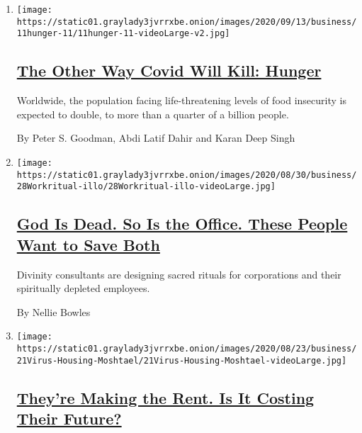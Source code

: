 \begin{enumerate}
\def\labelenumi{\arabic{enumi}.}
\item
  \texttt{[image: https://static01.graylady3jvrrxbe.onion/images/2020/09/13/business/11hunger-11/11hunger-11-videoLarge-v2.jpg]}

  \hypertarget{the-other-way-covid-will-kill-hunger-1}{%
  \subsection{\texorpdfstring{\href{/2020/09/11/business/covid-hunger-food-insecurity.html}{The
  Other Way Covid Will Kill:
  Hunger}}{The Other Way Covid Will Kill: Hunger}}\label{the-other-way-covid-will-kill-hunger-1}}

  Worldwide, the population facing life-threatening levels of food
  insecurity is expected to double, to more than a quarter of a billion
  people.

  By Peter S. Goodman, Abdi Latif Dahir and Karan Deep Singh
\item
  \texttt{[image: https://static01.graylady3jvrrxbe.onion/images/2020/08/30/business/28Workritual-illo/28Workritual-illo-videoLarge.jpg]}

  \hypertarget{god-is-dead-so-is-the-office-these-people-want-to-save-both}{%
  \subsection{\texorpdfstring{\href{/2020/08/28/business/remote-work-spiritual-consultants.html}{God
  Is Dead. So Is the Office. These People Want to Save
  Both}}{God Is Dead. So Is the Office. These People Want to Save Both}}\label{god-is-dead-so-is-the-office-these-people-want-to-save-both}}

  Divinity consultants are designing sacred rituals for corporations and
  their spiritually depleted employees.

  By Nellie Bowles
\item
  \texttt{[image: https://static01.graylady3jvrrxbe.onion/images/2020/08/23/business/21Virus-Housing-Moshtael/21Virus-Housing-Moshtael-videoLarge.jpg]}

  \hypertarget{theyre-making-the-rent-is-it-costing-their-future}{%
  \subsection{\texorpdfstring{\href{/2020/08/21/business/economy/rent-tenants-evictions.html}{They're
  Making the Rent. Is It Costing Their
  Future?}}{They're Making the Rent. Is It Costing Their Future?}}\label{theyre-making-the-rent-is-it-costing-their-future}}


\end{enumerate}
